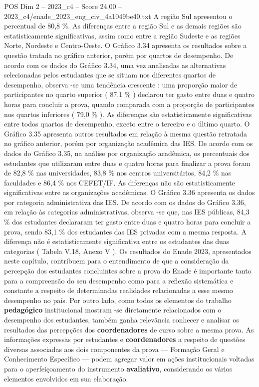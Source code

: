 \begin{textsample}{POS Dim 2 – 2023\_c4 – Score 24.00 – 2023\_c4/enade\_2023\_eng\_civ\_4a1049be40.txt}
A região Sul apresentou o percentual de 80,8 \%.
As diferenças entre a região Sul e as demais regiões são estatisticamente significativas, assim como entre a região Sudeste e as regiões Norte, Nordeste e Centro-Oeste.
O Gráfico 3.34 apresenta os resultados sobre a questão tratada no gráfico anterior, porém por quartos de desempenho.
De acordo com os dados do Gráfico 3.34, uma vez analisadas as alternativas selecionadas pelos estudantes que se situam nos diferentes quartos de desempenho, observa -se uma tendência crescente : uma proporção maior de participantes no quarto superior ( 87,1 \% ) declarou ter gasto entre duas e quatro horas para concluir a prova, quando comparada com a proporção de participantes nos quartos inferiores ( 79,0 \% ).
As diferenças são estatisticamente significativas entre todos quartos de desempenho, exceto entre o terceiro e o último quarto.
O Gráfico 3.35 apresenta outros resultados em relação à mesma questão retratada no gráfico anterior, porém por organização acadêmica das IES.
De acordo com os dados do Gráfico 3.35, na análise por organização acadêmica, os percentuais dos estudantes que utilizaram entre duas e quatro horas para finalizar a prova foram de 82,8 \% nas universidades, 83,8 \% nos centros universitários, 84,2 \% nas faculdades e 86,4 \% nos CEFET/IF.
As diferenças não são estatisticamente significativas entre as organizações acadêmicas.
O Gráfico 3.36 apresenta os dados por categoria administrativa das IES.
De acordo com os dados do Gráfico 3.36, em relação às categorias administrativas, observa -se que, nas IES públicas, 84,3 \% dos estudantes declararam ter gasto entre duas e quatro horas para concluir a prova, sendo 83,1 \% dos estudantes das IES privadas com a mesma resposta.
A diferença não é estatisticamente significativa entre os estudantes das duas categorias ( Tabela V.18, Anexo V ).
Os resultados do Enade 2023, apresentados neste capítulo, contribuem para o entendimento de que a consideração da percepção dos estudantes concluintes sobre a prova do Enade é importante tanto para a compreensão do seu desempenho como para a reflexão sistemática e constante a respeito de determinadas realidades relacionadas a esse mesmo desempenho no país.
Por outro lado, como todos os elementos do trabalho \textbf{pedagógico} institucional mostram -se diretamente relacionados com o desempenho dos estudantes, também ganha relevância conhecer e analisar os resultados das percepções dos \textbf{coordenadores} de curso sobre a mesma prova.
As informações expressas por estudantes e \textbf{coordenadores} a respeito de questões diversas associadas aos dois componentes da prova — Formação Geral e Conhecimento Específico — podem agregar valor em ações institucionais voltadas para o aperfeiçoamento do instrumento \textbf{avaliativo}, considerando os vários elementos envolvidos em sua elaboração.

\end{textsample}
